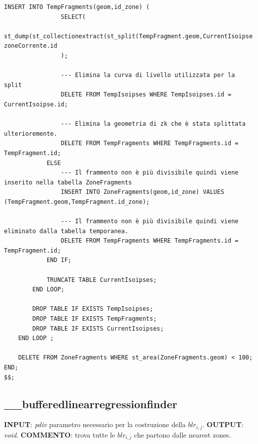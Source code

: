 \begin{lstlisting}[style = mystyle]
				INSERT INTO TempFragments(geom,id_zone) (
				SELECT(
					st_dump(st_collectionextract(st_split(TempFragment.geom,CurrentIsoipse.geom),3))).geom, zoneCorrente.id
				);
				
				--- Elimina la curva di livello utilizzata per la split
				DELETE FROM TempIsoipses WHERE TempIsoipses.id = CurrentIsoipse.id;
				
				--- Elimina la geometria di zk che è stata splittata ulterioremente.
				DELETE FROM TempFragments WHERE TempFragments.id = TempFragment.id;
			ELSE
				--- Il frammento non è più divisibile quindi viene inserito nella tabella ZoneFragments
				INSERT INTO ZoneFragments(geom,id_zone) VALUES (TempFragment.geom,TempFragment.id_zone);
				
				--- Il frammento non è più divisibile quindi viene eliminato dalla tabella temporanea.
				DELETE FROM TempFragments WHERE TempFragments.id = TempFragment.id;
			END IF;
			
			TRUNCATE TABLE CurrentIsoipses;
		END LOOP;

		DROP TABLE IF EXISTS TempIsoipses;
		DROP TABLE IF EXISTS TempFragments;
		DROP TABLE IF EXISTS CurrentIsoipses;
	END LOOP ;
	
	DELETE FROM ZoneFragments WHERE st_area(ZoneFragments.geom) < 100;
END;
$$;

\end{lstlisting}

\newpage
\subsection{\_\_bufferedlinearregressionfinder}
\textbf{INPUT}: \textit{pdiv} parametro necessario per la costruzione della $blr_{i,j}$. \newline
\textbf{OUTPUT}: \textit{void}. \newline
\textbf{COMMENTO}: trova tutte le $blr_{i,j}$ che partono dalle nearest zones.

